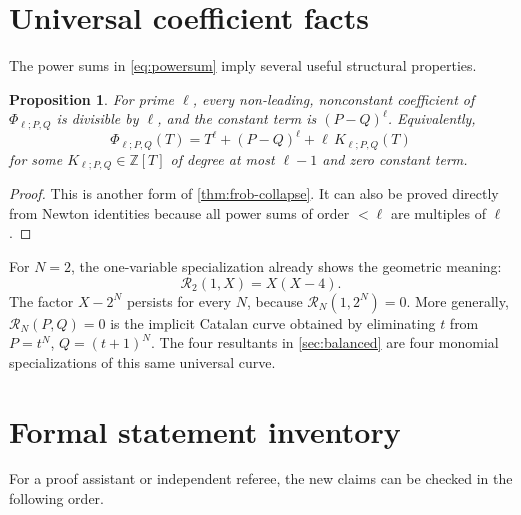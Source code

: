 \documentclass[11pt]{article}
\newtheorem{proposition}[theorem]{Proposition}
\theoremstyle{definition}
\theoremstyle{remark}
\newcommand{\ZZ}{\mathbb Z}
\begin{document}
\section{Universal coefficient facts}

The power sums in \eqref{eq:powersum} imply several useful structural properties.

\begin{proposition}
For prime \(\ell\), every non-leading, nonconstant coefficient of
\(\Phi_{\ell;P,Q}\) is divisible by \(\ell\), and the constant term is \((P-Q)^\ell\).  Equivalently,
\[
\Phi_{\ell;P,Q}(T)
=T^\ell+(P-Q)^\ell+\ell\,K_{\ell;P,Q}(T)
\]
for some \(K_{\ell;P,Q}\in\ZZ[T]\) of degree at most \(\ell-1\) and zero constant term.
\end{proposition}

\begin{proof}
This is another form of \cref{thm:frob-collapse}.  It can also be proved directly from Newton identities because all power sums of order \(<\ell\) are multiples of \(\ell\).
\end{proof}

For \(N=2\), the one-variable specialization already shows the geometric meaning:
\[
\mathscr R_2(1,X)=X(X-4).
\]
The factor \(X-2^N\) persists for every \(N\), because
\(\mathscr R_N(1,2^N)=0\).  More generally, \(\mathscr R_N(P,Q)=0\) is the implicit Catalan curve obtained by eliminating \(t\) from
\(P=t^N\), \(Q=(t+1)^N\).  The four resultants in \cref{sec:balanced} are four monomial specializations of this same universal curve.

\section{Formal statement inventory}

For a proof assistant or independent referee, the new claims can be checked in the following order.
\end{document}
